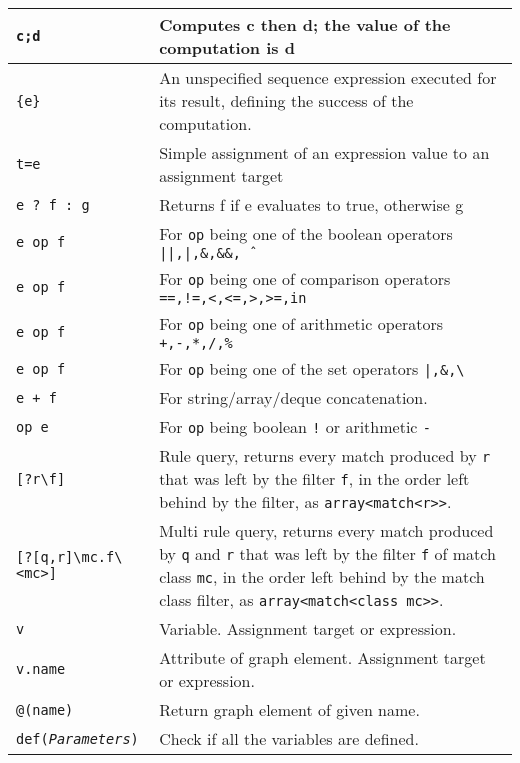 \begin{table}[htbp]
\begin{minipage}{\linewidth} \renewcommand{\footnoterule}{} 
\begin{tabularx}{\linewidth}{|lX|}
\hline
\texttt{c;d} & Computes c then d; the value of the computation is d\\
\hline
\texttt{\{e\}} & An unspecified sequence expression executed for its result, defining the success of the computation.\\
\hline
\texttt{t=e} & Simple assignment of an expression value to an assignment target\\
\hline
\texttt{e ? f : g} & Returns f if e evaluates to true, otherwise g \\
\texttt{e op f} & For \texttt{op} being one of the boolean operators \texttt{||,|,\&,\&\&,\^\ } \\
\texttt{e op f} & For \texttt{op} being one of comparison operators \texttt{==,!=,<,<=,>,>=,in} \\
\texttt{e op f} & For \texttt{op} being one of arithmetic operators \texttt{+,-,*,/,\%} \\
\texttt{e op f} & For \texttt{op} being one of the set operators \texttt{|,\&,\textbackslash} \\
\texttt{e + f} & For string/array/deque concatenation. \\
\texttt{op e} & For \texttt{op} being boolean \texttt{!} or arithmetic \texttt{-}\\
\hline
\texttt{[?r\textbackslash f]} & Rule query, returns every match produced by \texttt{r} that was left by the filter \texttt{f}, in the order left behind by the filter, as \texttt{array<match<r>>}. \\
\texttt{[?[q,r]\textbackslash mc.f\textbackslash<mc>]} & Multi rule query, returns every match produced by \texttt{q} and \texttt{r} that was left by the filter \texttt{f} of match class \texttt{mc}, in the order left behind by the match class filter, as \texttt{array<match<class mc>>}. \\
\hline
\texttt{v} & Variable. Assignment target or expression.\\
\texttt{v.name} & Attribute of graph element. Assignment target or expression.\\
\texttt{@(name)} & Return graph element of given name.\\
\texttt{def(\emph{Parameters})} & Check if all the variables are defined.\\

\end{tabularx}
\end{minipage}
\end{table}
